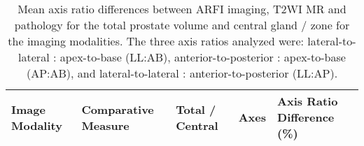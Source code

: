 \begin{table}
\centering
\caption{Mean axis ratio differences between ARFI imaging, T2WI MR and
    pathology for the total prostate volume and central gland / zone for the
    imaging modalities.  The three axis ratios analyzed were:
    lateral-to-lateral : apex-to-base (LL:AB), anterior-to-posterior :
    apex-to-base (AP:AB), and lateral-to-lateral : anterior-to-posterior
    (LL:AP).}
\begin{tabular}{|l|l|l|l|l|} \hline
{\bf Image Modality} & {\bf Comparative Measure} & {\bf Total / Central} & {\bf Axes} & {\bf Axis Ratio Difference (\%)} \\ \hline

\hline
\end{tabular}
\label{tab:axis_ratio_over_under}
\end{table}
